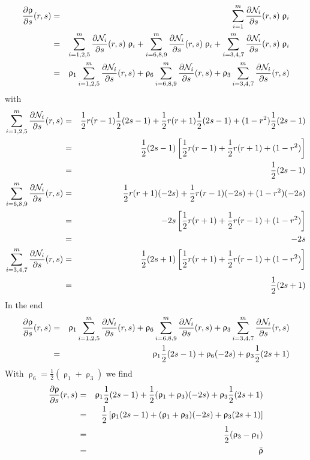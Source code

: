 \begin{eqnarray}
\frac{\partial\uprho}{\partial s}(r,s) 
&=& \sum_{i=1}^m \frac{\partial{\mathcal{N}}_i}{\partial s}(r,s)\; \uprho_i  \nonumber\\ 
&=&\sum_{i=1,2,5}^m \frac{\partial{\mathcal{N}}_i}{\partial s}(r,s)\; \uprho_i  
+  \sum_{i=6,8,9}^m \frac{\partial{\mathcal{N}}_i}{\partial s}(r,s)\; \uprho_i  
+  \sum_{i=3,4,7}^m \frac{\partial{\mathcal{N}}_i}{\partial s}(r,s)\; \uprho_i  \nonumber\\ 
&=&\uprho_1\sum_{i=1,2,5}^m \frac{\partial{\mathcal{N}}_i}{\partial s}(r,s)
+  \uprho_6\sum_{i=6,8,9}^m \frac{\partial{\mathcal{N}}_i}{\partial s}(r,s)
+  \uprho_3\sum_{i=3,4,7}^m \frac{\partial{\mathcal{N}}_i}{\partial s}(r,s) 
\end{eqnarray}
with
\begin{eqnarray}
\sum_{i=1,2,5}^m \frac{\partial{\mathcal{N}}_i}{\partial s}(r,s)
&=&  \frac{1}{2}r(r-1)  \frac{1}{2}(2s-1) + \frac{1}{2}r(r+1)  \frac{1}{2}(2s-1) +   (1-r^2)  \frac{1}{2}(2s-1) \nonumber\\
&=& \frac{1}{2}(2s-1) \left[ \frac{1}{2}r(r-1)   + \frac{1}{2}r(r+1)  +   (1-r^2)  \right] \nonumber\\
&=& \frac{1}{2}(2s-1)  \nonumber\\
\sum_{i=6,8,9}^m \frac{\partial{\mathcal{N}}_i}{\partial s}(r,s)
&=& \frac{1}{2}r(r+1)        (-2s) + \frac{1}{2}r(r-1)        (-2s) +    (1-r^2)        (-2s)  \nonumber\\
&=& -2s \left[ \frac{1}{2}r(r+1)    + \frac{1}{2}r(r-1)    +    (1-r^2)      \right]\nonumber\\
&=& -2s  \nonumber\\
\sum_{i=3,4,7}^m \frac{\partial{\mathcal{N}}_i}{\partial s}(r,s)
&=& \frac{1}{2}(2s+1)  \left[ \frac{1}{2}r(r+1)  +   \frac{1}{2}r(r-1)   +  (1-r^2)  \right]\nonumber\\
&=& \frac{1}{2}(2s+1)  \nonumber
\end{eqnarray}
In the end
\begin{eqnarray}
\frac{\partial\uprho}{\partial s}(r,s) 
&=&\uprho_1\sum_{i=1,2,5}^m \frac{\partial{\mathcal{N}}_i}{\partial s}(r,s)
+  \uprho_6\sum_{i=6,8,9}^m \frac{\partial{\mathcal{N}}_i}{\partial s}(r,s)
+  \uprho_3\sum_{i=3,4,7}^m \frac{\partial{\mathcal{N}}_i}{\partial s}(r,s) \nonumber\\
&=& \uprho_1  \frac{1}{2}(2s-1)  + \uprho_6 (-2s) + \uprho_3 \frac{1}{2}(2s+1) \nonumber
\end{eqnarray}
With $\uprho_6=\frac12 (\uprho_1+\uprho_3)$ we find
\begin{eqnarray}
\frac{\partial\uprho}{\partial s}(r,s) 
&=& \uprho_1  \frac{1}{2}(2s-1)  + \frac12 (\uprho_1+\uprho_3) (-2s) + \uprho_3 \frac{1}{2}(2s+1) \nonumber\\
&=& \frac12 \left[ \uprho_1 (2s-1)  + (\uprho_1+\uprho_3) (-2s) + \uprho_3 (2s+1)\right] \nonumber\\
&=& \frac12 (\uprho_3-\uprho_1) \nonumber\\
&=& \bar{\uprho} \nonumber
\end{eqnarray}
